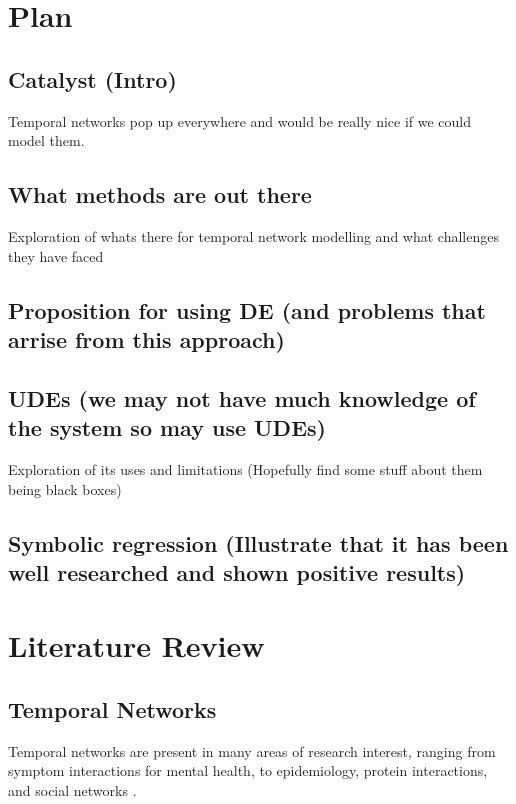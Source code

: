 \documentclass[12pt]{amsart}
\begin{document}
    
\section{Plan}
    \subsection{Catalyst (Intro)}
        Temporal networks pop up everywhere and would be really nice if we could model them.


    \subsection{What methods are out there}
        Exploration of whats there for temporal network modelling and what challenges they have faced



    
    \subsection{Proposition for using DE (and problems that arrise from this approach)}



    \subsection{UDEs (we may not have much knowledge of the system so may use UDEs)}
        Exploration of its uses and limitations
        (Hopefully find some stuff about them being black boxes)

    \subsection{Symbolic regression (Illustrate that it has been well researched and shown positive results)}

    

\section{Literature Review}

\subsection{Temporal Networks}
    Temporal networks are present in many areas of research interest, ranging from symptom interactions for mental health, to epidemiology, protein interactions, and social networks \cite{jordan2020current,contreras2020temporal,lucas2021inferring,jin2009identifying,masuda2013predicting,moinet2015burstiness,hanneke2010discrete}. 
    
\end{document}
